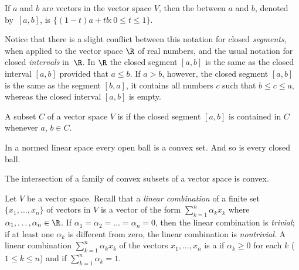 \begin{defn}\label{C017314} If $a$ and $b$ are vectors in the vector space $V$, then the
 between $a$ and $b$, denoted
by~$[a,b]$, is $\{(1 - t)a + tb \colon 0 \le t \le 1\}$.
\end{defn}

\begin{cau}\label{C017317} Notice that there is a slight conflict between this notation for closed \emph{segments}, when
applied to the vector space $\R$ of real numbers, and the usual notation for closed \emph{intervals} in~$\R$.
In $\R$ the closed segment $[a,b]$ is the same as the closed
interval $[a,b]$ provided that $a \le b$. If $a > b$, however, the closed segment $[a,b]$
is the same as the segment $[b,a]$, it contains all numbers $c$ such that $b \le c \le
a$, whereas the closed interval $[a,b]$ is empty.
\end{cau}

\begin{defn} A subset $C$ of a vector space $V$ is
 if the closed segment $[a,b]$ is contained in $C$ whenever $a$, $b \in C$.
\end{defn}

\begin{exam}\label{C023169}  In a normed linear space every open ball is a convex set.  And so is every closed ball.
\end{exam}

\begin{prop}\label{prop_intrsctn_convex} The intersection of a family of convex subsets of a vector space is convex.
\end{prop}

\begin{defn} Let $V$ be a vector space. Recall that a \emph{linear combination} of a finite set $\{x_1, \dots, x_n\}$
of vectors in $V$ is a vector of the form $\sum_{k=1}^n \alpha_k x_k$ where $\alpha_1, \dots, \alpha_n \in \R$.
If $\alpha_1 = \alpha_2 = \dots = \alpha_n = 0$, then the linear combination is \emph{trivial}; if at least one
$\alpha_k$ is different from zero, the linear combination is \emph{nontrivial}.  A linear combination
$\sum_{k=1}^n\alpha_k x_k$ of the vectors $x_1, \dots, x_n$ is a
 if $\alpha_k \ge 0$ for each $k$ ($1 \le k \le n$) and if $\sum_{k=1}^n \alpha_k = 1$.
\end{defn}

